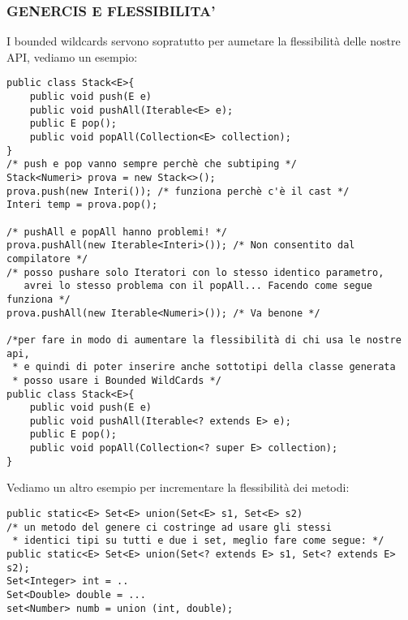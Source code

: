 \subsubsection{GENERCIS E FLESSIBILITA'}
\noindent I bounded wildcards servono sopratutto per aumetare la flessibilità delle nostre API, vediamo un esempio:
\begin{lstlisting}
public class Stack<E>{
	public void push(E e)
	public void pushAll(Iterable<E> e);
	public E pop();
	public void popAll(Collection<E> collection);
}
/* push e pop vanno sempre perchè che subtiping */
Stack<Numeri> prova = new Stack<>();
prova.push(new Interi()); /* funziona perchè c'è il cast */
Interi temp = prova.pop();

/* pushAll e popAll hanno problemi! */
prova.pushAll(new Iterable<Interi>()); /* Non consentito dal compilatore */
/* posso pushare solo Iteratori con lo stesso identico parametro,
   avrei lo stesso problema con il popAll... Facendo come segue funziona */
prova.pushAll(new Iterable<Numeri>()); /* Va benone */ 

/*per fare in modo di aumentare la flessibilità di chi usa le nostre api,
 * e quindi di poter inserire anche sottotipi della classe generata 
 * posso usare i Bounded WildCards */
public class Stack<E>{
	public void push(E e)
	public void pushAll(Iterable<? extends E> e);
	public E pop();
	public void popAll(Collection<? super E> collection);
}

\end{lstlisting}
\noindent Vediamo un altro esempio per incrementare la flessibilità dei metodi:
\begin{lstlisting}
public static<E> Set<E> union(Set<E> s1, Set<E> s2)
/* un metodo del genere ci costringe ad usare gli stessi
 * identici tipi su tutti e due i set, meglio fare come segue: */
public static<E> Set<E> union(Set<? extends E> s1, Set<? extends E> s2);
Set<Integer> int = ..
Set<Double> double = ...
set<Number> numb = union (int, double);
\end{lstlisting}

